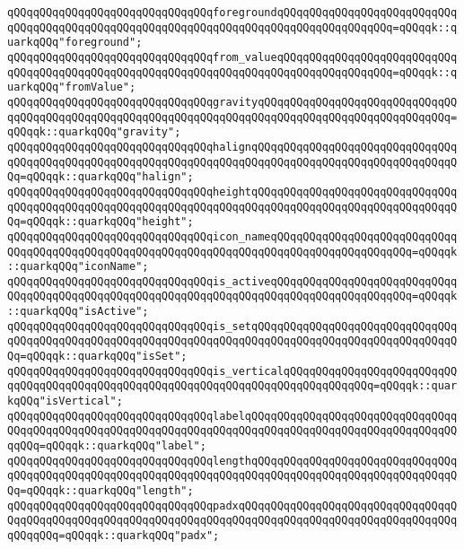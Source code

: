 \verb|qQQqqQQqqQQqqQQqqQQqqQQqqQQqqQQqforegroundqQQqqQQqqQQqqQQqqQQqqQQqqQQqqQQqqQQqqQQqqQQqqQQqqQQqqQQqqQQqqQQqqQQqqQQqqQQqqQQqqQQqqQQq=qQQqqk::quarkqQQq"foreground";|\newline
\verb|qQQqqQQqqQQqqQQqqQQqqQQqqQQqqQQqfrom_valueqQQqqQQqqQQqqQQqqQQqqQQqqQQqqQQqqQQqqQQqqQQqqQQqqQQqqQQqqQQqqQQqqQQqqQQqqQQqqQQqqQQqqQQq=qQQqqk::quarkqQQq"fromValue";|\newline
\verb|qQQqqQQqqQQqqQQqqQQqqQQqqQQqqQQqgravityqQQqqQQqqQQqqQQqqQQqqQQqqQQqqQQqqQQqqQQqqQQqqQQqqQQqqQQqqQQqqQQqqQQqqQQqqQQqqQQqqQQqqQQqqQQqqQQqqQQq=qQQqqk::quarkqQQq"gravity";|\newline
\verb|qQQqqQQqqQQqqQQqqQQqqQQqqQQqqQQqhalignqQQqqQQqqQQqqQQqqQQqqQQqqQQqqQQqqQQqqQQqqQQqqQQqqQQqqQQqqQQqqQQqqQQqqQQqqQQqqQQqqQQqqQQqqQQqqQQqqQQqqQQq=qQQqqk::quarkqQQq"halign";|\newline
\verb|qQQqqQQqqQQqqQQqqQQqqQQqqQQqqQQqheightqQQqqQQqqQQqqQQqqQQqqQQqqQQqqQQqqQQqqQQqqQQqqQQqqQQqqQQqqQQqqQQqqQQqqQQqqQQqqQQqqQQqqQQqqQQqqQQqqQQqqQQq=qQQqqk::quarkqQQq"height";|\newline
\verb|qQQqqQQqqQQqqQQqqQQqqQQqqQQqqQQqicon_nameqQQqqQQqqQQqqQQqqQQqqQQqqQQqqQQqqQQqqQQqqQQqqQQqqQQqqQQqqQQqqQQqqQQqqQQqqQQqqQQqqQQqqQQqqQQq=qQQqqk::quarkqQQq"iconName";|\newline
\verb|qQQqqQQqqQQqqQQqqQQqqQQqqQQqqQQqis_activeqQQqqQQqqQQqqQQqqQQqqQQqqQQqqQQqqQQqqQQqqQQqqQQqqQQqqQQqqQQqqQQqqQQqqQQqqQQqqQQqqQQqqQQqqQQq=qQQqqk::quarkqQQq"isActive";|\newline
\verb|qQQqqQQqqQQqqQQqqQQqqQQqqQQqqQQqis_setqQQqqQQqqQQqqQQqqQQqqQQqqQQqqQQqqQQqqQQqqQQqqQQqqQQqqQQqqQQqqQQqqQQqqQQqqQQqqQQqqQQqqQQqqQQqqQQqqQQqqQQq=qQQqqk::quarkqQQq"isSet";|\newline
\verb|qQQqqQQqqQQqqQQqqQQqqQQqqQQqqQQqis_verticalqQQqqQQqqQQqqQQqqQQqqQQqqQQqqQQqqQQqqQQqqQQqqQQqqQQqqQQqqQQqqQQqqQQqqQQqqQQqqQQqqQQq=qQQqqk::quarkqQQq"isVertical";|\newline
\verb|qQQqqQQqqQQqqQQqqQQqqQQqqQQqqQQqlabelqQQqqQQqqQQqqQQqqQQqqQQqqQQqqQQqqQQqqQQqqQQqqQQqqQQqqQQqqQQqqQQqqQQqqQQqqQQqqQQqqQQqqQQqqQQqqQQqqQQqqQQqqQQq=qQQqqk::quarkqQQq"label";|\newline
\verb|qQQqqQQqqQQqqQQqqQQqqQQqqQQqqQQqlengthqQQqqQQqqQQqqQQqqQQqqQQqqQQqqQQqqQQqqQQqqQQqqQQqqQQqqQQqqQQqqQQqqQQqqQQqqQQqqQQqqQQqqQQqqQQqqQQqqQQqqQQq=qQQqqk::quarkqQQq"length";|\newline
\verb|qQQqqQQqqQQqqQQqqQQqqQQqqQQqqQQqpadxqQQqqQQqqQQqqQQqqQQqqQQqqQQqqQQqqQQqqQQqqQQqqQQqqQQqqQQqqQQqqQQqqQQqqQQqqQQqqQQqqQQqqQQqqQQqqQQqqQQqqQQqqQQqqQQq=qQQqqk::quarkqQQq"padx";|\newline
